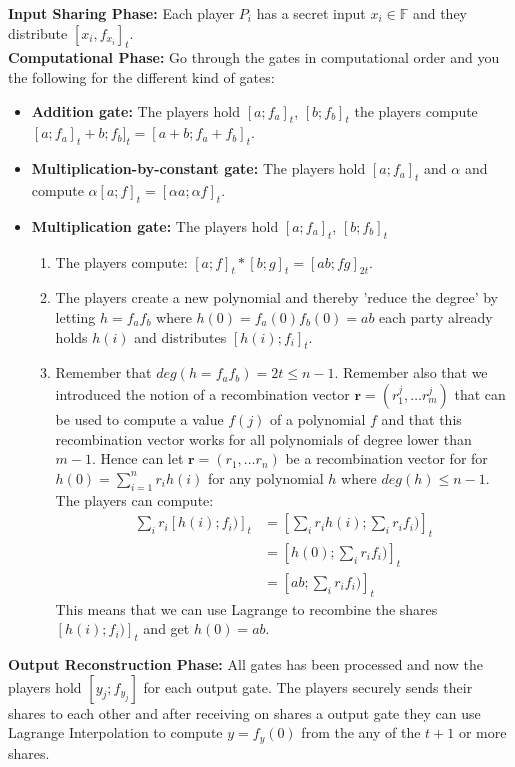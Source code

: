 \noindent\textbf{Input Sharing Phase:} Each player $P_i$ has a secret input $x_i \in \mathbb{F}$ and they distribute $[x_i,f_{x_i}]_t$.  \\

\noindent\textbf{Computational Phase:} Go through the gates in computational order and you the following for the different kind of gates:

\begin{itemize}
    \item \textbf{Addition gate:} The players hold $[a;f_a]_t$, $[b; f_b]_t$ the players compute $[a;f_a]_t + b; f_b]_t = [a+b;f_a+f_b]_t$.
    \item \textbf{Multiplication-by-constant gate:} The players hold $[a;f_a]_t$ and $\alpha$ and compute $\alpha [a;f]_t = [\alpha a; \alpha f]_t$.
    \item \textbf{Multiplication gate:} The players hold $[a;f_a]_t$, $[b; f_b]_t$ 
    \begin{enumerate}
        \item The players compute: $[a;f]_t * [b;g]_t = [ab;fg]_{2t}$.
        \item The players create a new polynomial and thereby 'reduce the degree' by letting $h=f_a f_b$ where $h(0)=f_a(0)f_b(0)=ab$ each party already holds $h(i)$ and distributes $[h(i);f_i]_t$.
        \item Remember that $deg(h=f_a f_b)=2t \leq n-1$. Remember also that we introduced the notion of a recombination vector $\textbf{r}=(r_1^j,\dots r_m^j)$ that can be used to compute a value $f(j)$ of a polynomial $f$ and that this recombination vector works for all polynomials of degree lower than $m-1$. Hence can let $\textbf{r}=(r_1,\dots r_n)$ be a recombination vector for for $h(0)=\sum_{i=1}^n r_i h(i)$ for any polynomial $h$ where $deg(h) \leq n-1$. The players can compute: 
        \begin{align*}
             \sum_i r_i[h(i);f_i)]_t &= [\sum_i r_i h(i);\sum_i r_if_i)]_t \\
             &= [h(0);\sum_i r_if_i)]_t \\
             &=[ab;\sum_i r_if_i)]_t
        \end{align*}
        This means that we can use Lagrange to recombine the shares $[h(i);f_i)]_t$ and get $h(0)=ab$.
    \end{enumerate}
\end{itemize}

\noindent\textbf{Output Reconstruction Phase:} All gates has been processed and now the players hold $[y_j ; f_{y_j}]$ for each output gate. The players securely sends their shares to each other and after receiving on shares a output gate they can use Lagrange Interpolation to compute $y=f_y(0)$ from the any of the $t+1$ or more shares.

